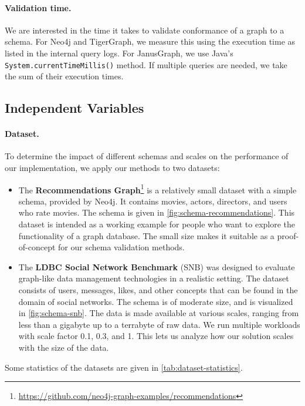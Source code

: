 \documentclass{report}
\theoremstyle{definition}
\begin{document}
\paragraph{Validation time.} We are interested in the time it takes to validate conformance of a graph to a schema. For Neo4j and TigerGraph, we measure this using the execution time as listed in the internal query logs. For JanusGraph, we use Java's \texttt{System.currentTimeMillis()} method. If multiple queries are needed, we take the sum of their execution times.

\subsection{Independent Variables}

\paragraph{Dataset.} To determine the impact of different schemas and scales on the performance of our implementation, we apply our methods to two datasets:

\begin{itemize}
  \item The \textbf{Recommendations Graph}\footnote{\url{https://github.com/neo4j-graph-examples/recommendations}} is a relatively small dataset with a simple schema, provided by Neo4j. It contains movies, actors, directors, and users who rate movies. The schema is given in \autoref{fig:schema-recommendations}. This dataset is intended as a working example for people who want to explore the functionality of a graph database. The small size makes it suitable as a proof-of-concept for our schema validation methods.
  \item The \textbf{LDBC Social Network Benchmark} (SNB) \citep{angles2020snb} was designed to evaluate graph-like data management technologies in a realistic setting. The dataset consists of users, messages, likes, and other concepts that can be found in the domain of social networks. The schema is of moderate size, and is visualized in \autoref{fig:schema-snb}. The data is made available at various scales, ranging from less than a gigabyte up to a terrabyte of raw data. We run multiple workloads with scale factor 0.1, 0.3, and 1. This lets us analyze how our solution scales with the size of the data.
\end{itemize}

Some statistics of the datasets are given in \autoref{tab:dataset-statistics}.
\end{document}

